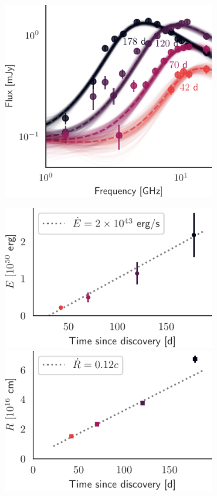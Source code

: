 \documentclass[a4paper,11pt]{article}
\begin{document}
\begin{figure}
	\begin{subfigure}{0.45\textwidth}
		\includegraphics[width=\linewidth]{figures/radio_data}
	\end{subfigure}
	\begin{subfigure}{0.40\textwidth}
		\includegraphics[width=\linewidth]{figures/outflow_energy}
		\includegraphics[width=\linewidth]{figures/outflow_radius}

\end{subfigure}
\end{figure}
\end{document}
